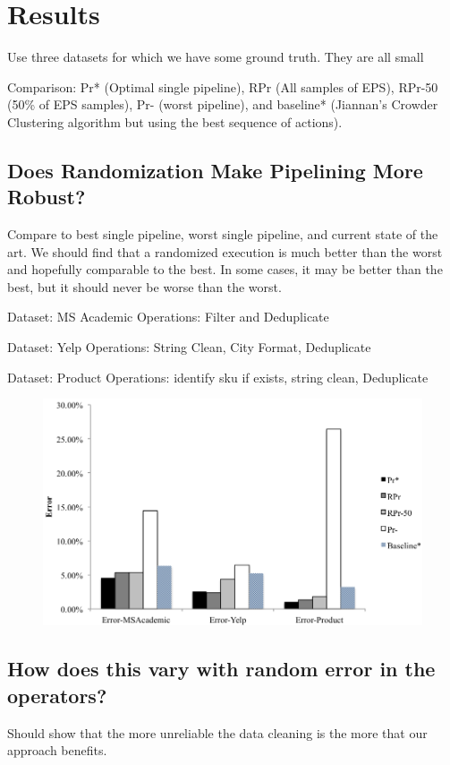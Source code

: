 \section{Results}
Use three datasets for which we have some ground truth. They are all small

Comparison: Pr* (Optimal single pipeline), RPr (All samples of EPS), RPr-50 (50\% of EPS samples), Pr- (worst pipeline), and baseline* (Jiannan's Crowder Clustering algorithm but using the best sequence of actions).

\subsection{Does Randomization Make Pipelining More Robust?}
Compare to best single pipeline, worst single pipeline, and current state of the art.
We should find that a randomized execution is much better than the worst and hopefully comparable to the best.
In some cases, it may be better than the best, but it should never be worse than the worst.

Dataset: MS Academic 
Operations: Filter and Deduplicate

Dataset: Yelp 
Operations: String Clean, City Format, Deduplicate

Dataset: Product 
Operations: identify sku if exists, string clean, Deduplicate

\begin{figure}[ht]
\centering
\includegraphics[scale=0.4]{fig1.png}
\caption{}
\label{exp:ms-academic-ranking}
\end{figure}

\subsection{How does this vary with random error in the operators?}
Should show that the more unreliable the data cleaning is the more that our approach benefits.

